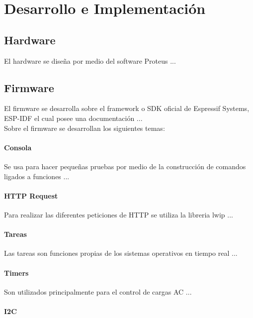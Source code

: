 \chapter{Desarrollo e Implementación}

\section{Hardware}

El hardware se diseña por medio del software Proteus ...

\section{Firmware}

El firmware se desarrolla sobre el framework o SDK oficial de Espressif Systems, ESP-IDF el cual posee una documentación ...\\

Sobre el firmware se desarrollan los siguientes temas:

\subsubsection{Consola}

Se usa para hacer pequeñas pruebas por medio de la construcción de comandos ligados a funciones ...

\subsubsection{HTTP Request}

Para realizar las diferentes peticiones de HTTP se utiliza la libreria lwip ...

\subsubsection{Tareas}

Las tareas son funciones propias de los sistemas operativos en tiempo real ...

\subsubsection{Timers}

Son utilizados principalmente para el control de cargas AC ...

\subsubsection{I2C}

